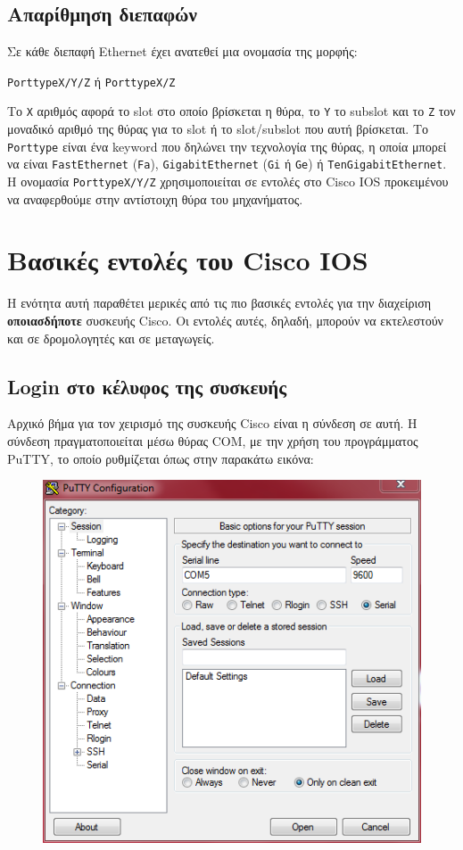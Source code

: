 \documentclass[12pt]{article}
\begin{document}
\subsection{Απαρίθμηση διεπαφών}
Σε κάθε διεπαφή Ethernet έχει ανατεθεί μια ονομασία της μορφής:

\begin{center}
	\texttt{\large PorttypeΧ/Υ/Z}\hspace*{0.5cm} ή\hspace*{0.5cm} \texttt{\large PorttypeΧ/Z}
\end{center}

Το \texttt{Χ} αριθμός αφορά το slot στο οποίο βρίσκεται η θύρα, το \texttt{Y} το subslot και το \texttt{Z} τον μοναδικό αριθμό της θύρας για το slot ή το slot/subslot που αυτή βρίσκεται. Το \texttt{Porttype} είναι ένα keyword που δηλώνει την τεχνολογία της θύρας, η οποία μπορεί να είναι \texttt{FastEthernet} (\texttt{Fa}), \texttt{GigabitEthernet} (\texttt{Gi} ή \texttt{Ge}) ή \texttt{TenGigabitEthernet}. Η ονομασία \texttt{PorttypeΧ/Υ/Z} χρησιμοποιείται σε εντολές στο Cisco IOS προκειμένου να αναφερθούμε στην αντίστοιχη θύρα του μηχανήματος.

\section{Βασικές εντολές του Cisco IOS}
H ενότητα αυτή παραθέτει μερικές από τις πιο βασικές εντολές για την διαχείριση \textbf{οποιασδήποτε} συσκευής Cisco. Οι εντολές αυτές, δηλαδή, μπορούν να εκτελεστούν και σε δρομολογητές και σε μεταγωγείς.

\subsection{Login στο κέλυφος της συσκευής}
Αρχικό βήμα για τον χειρισμό της συσκευής Cisco είναι η σύνδεση σε αυτή. Η σύνδεση πραγματοποιείται μέσω θύρας COM, με την χρήση του προγράμματος PuTTY, το οποίο ρυθμίζεται όπως στην παρακάτω εικόνα:

\begin{figure}[H]
	\centering
	\includegraphics[scale=0.75]{login1}
\end{figure}
\end{document}
